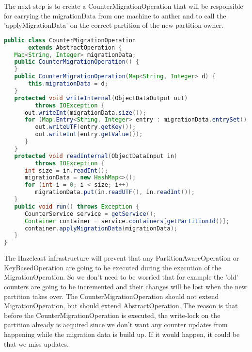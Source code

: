The next step is to create a CounterMigrationOperation that will be responsible for carrying the migrationData from one machine to anther and to call the 'applyMigrationData' on the correct partition of the new partition owner.
\begin{lstlisting}[language=java]
public class CounterMigrationOperation 
       extends AbstractOperation {
   Map<String, Integer> migrationData;
   public CounterMigrationOperation() {
   }
   public CounterMigrationOperation(Map<String, Integer> d) {
       this.migrationData = d;
   }
   protected void writeInternal(ObjectDataOutput out) 
         throws IOException {
      out.writeInt(migrationData.size());
      for (Map.Entry<String, Integer> entry : migrationData.entrySet()) {
         out.writeUTF(entry.getKey());
         out.writeInt(entry.getValue());
      }
   }
   protected void readInternal(ObjectDataInput in) 
         throws IOException {
      int size = in.readInt();
      migrationData = new HashMap<>();
      for (int i = 0; i < size; i++)
         migrationData.put(in.readUTF(), in.readInt());
   }
   public void run() throws Exception {
      CounterService service = getService();
      Container container = service.containers[getPartitionId()];
      container.applyMigrationData(migrationData);
   }
}
\end{lstlisting}
The Hazelcast infrastructure will prevent that any PartitionAwareOperation or KeyBasedOperation are going to be executed during the execution of the MigrationOperation. So we don't need to be worried that for example the 'old' counters are going to be incremented and their changes will be lost when the new partition takes over. The CounterMigrationOperation should not extend MigrationOperation, but should extend AbstractOperation. The reason is that before the CounterMigrationOperation is executed, the write-lock on the partition already is acquired since we don't want any counter updates from happening while the migration data is build up. If it would happen, it could be that we miss updates. 

